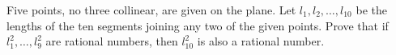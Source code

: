 Five points, no three collinear, are given on the plane. Let $l_1,l_2,\ldots ,l_{10}$ be the lengths of the ten segments joining any two of the given points. Prove that if $l_1^2,\ldots ,l_9^2$ are rational numbers, then $l_{10}^2$ is also a rational number.